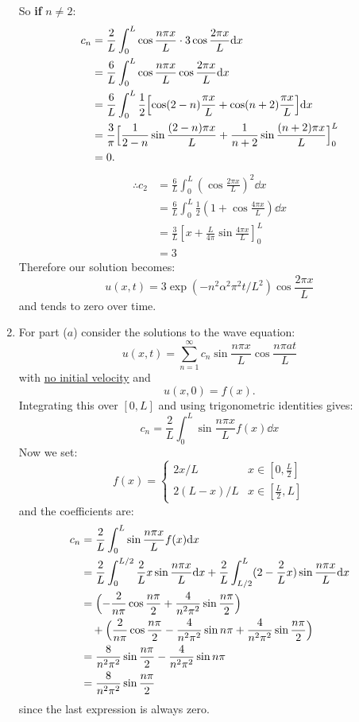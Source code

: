 \begin{enumerate}
    \newpage
    So \textbf{if} \underline{$n\neq2$}:
    \begin{align*}
        c_n
        &=\frac{2}{L}\int_{0}^{L}\cos\frac{n\pi x}{L}\cdot 3\cos\frac{2\pi x}{L}\dd x \\
        &=\frac{6}{L}\int_{0}^{L}\cos\frac{n\pi x}{L}\cos\frac{2\pi x}{L}\dd x \\
        &=\frac{6}{L}\int_{0}^{L}\frac{1}{2}\Bigl[\cos(2-n)\frac{\pi x}{L}
        +\cos(n+2)\frac{\pi x}{L}\Bigl]\dd x \\
        &=\frac{3}{\pi}\Bigl[\frac{1}{2-n}\sin\frac{(2-n)\pi x}{L}
        +\frac{1}{n+2}\sin\frac{(n+2)\pi x}{L}\Bigl]_{0}^{L} \\
        &=0.
    \end{align*}
    \begin{align*}
        \therefore c_2
        &=\frac{6}{L}
        \int_{0}^{L}\left(\cos\frac{2\pi x}{L}\right)^2\dd x \\
        &=\frac{6}{L}
        \int_{0}^{L}\frac{1}{2}
        \left(1+\cos\frac{4\pi x}{L}\right)\dd x \\
        &=\frac{3}{L}\left[x+\frac{L}{4\pi}\sin\frac{4\pi x}{L}\right]_{0}^{L} \\
        &=3
    \end{align*}
    Therefore our solution becomes:
    $$u(x,t)=3\exp\left(-n^2\alpha^2\pi^2 t/L^2\right)\cos\frac{2\pi x}{L}$$
    and tends to zero over time.

    \newpage

    \item For part ($a$) consider the solutions to the wave equation:
    $$u(x,t)=\sum_{n=1}^{\infty}c_n
    \sin\frac{n\pi x}{L}\cos\frac{n\pi at}{L}$$
    with \underline{no initial velocity} and
    $$u(x,0)=f(x).$$
    Integrating this over $[0,L]$ and using trigonometric identities gives:
    $$c_n=\frac{2}{L}\int_{0}^{L}
    \sin\frac{n\pi x}{L}f(x)\dd x$$
    Now we set:
    $$f(x)=
    \left\{
    \begin{array}{ll}
	   2x/L  & \mbox{} x\in[0,\frac{L}{2}] \\
	   2(L-x)/L & \mbox{} x\in[\frac{L}{2},L]
    \end{array}
    \right.$$
    and the coefficients are:
    \begin{align*}
        c_n
        &=\frac{2}{L}\int_{0}^{L}
        \sin\frac{n\pi x}{L}f(x)\dd x \\
        &=\frac{2}{L}\int_{0}^{L/2}
        \frac{2}{L}x\sin\frac{n\pi x}{L}\dd x
        +\frac{2}{L}\int_{L/2}^{L}
        (2-\frac{2}{L}x)\sin\frac{n\pi x}{L}\dd x \\
        &=\Bigl(-\frac{2}{n\pi}\cos\frac{n\pi}{2}
        +\frac{4}{n^2\pi^2}\sin\frac{n\pi}{2}\Bigl) \\
        &\quad+
        \Bigl(\frac{2}{n\pi}\cos\frac{n\pi}{2}
        -\frac{4}{n^2\pi^2}\sin n\pi
        +\frac{4}{n^2\pi^2}\sin\frac{n\pi}{2}\Bigl) \\
        &=\frac{8}{n^2\pi^2}\sin\frac{n\pi}{2}
        -\frac{4}{n^2\pi^2}\sin n\pi \\
        &=\frac{8}{n^2\pi^2}\sin\frac{n\pi}{2}
    \end{align*}
    since the last expression is always zero.


\end{enumerate}
